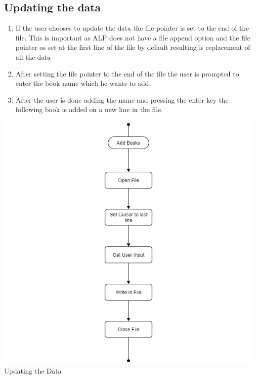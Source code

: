 \documentclass[conference]{IEEEtran}
\newenvironment{Figure}
  {\par\medskip\noindent\minipage{\linewidth}}
  {\endminipage\par\medskip}
\begin{document}
\subsection{Updating the data}
\begin{enumerate}
    \item If the user chooses to update the data the file pointer is set to the end of the file. This is important as ALP does not have a file append option and the file pointer os set at the first line of the file by default resulting is replacement of all the data
    \item After setting the file pointer to the end of the file the user is prompted to enter the book name which he wants to add.
    \item After the user is done adding the name and pressing the enter key the following book is added on a new line in the file.
\end{enumerate}
\begin{Figure}
    \centering
    \includegraphics[width=\linewidth]{../resources/flowchart/addbooks.png}
    \figurename{Updating the Data}
\end{Figure}
\end{document}
